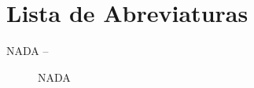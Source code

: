 % 
% 
% 

\pagestyle{abstractst}

\chapter*{Lista de Abreviaturas}
\label{lista_abreviaturas}
\begin{description}
	\item[NADA --] NADA
\end{description}
